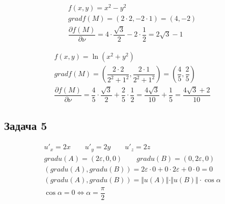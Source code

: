 \documentclass[a4paper,fleqn,12pt]{article}
\theoremstyle{definition}
\begin{document}
\begin{gather*}
f(x,y) = x^2 - y^2\\
gradf(M) = (2\cdot 2, -2 \cdot 1) = (4,-2)\\
\dfrac{\partial f(M)}{\partial \nu} = 4 \cdot \dfrac{\sqrt{3}}{2} -2 \cdot \dfrac{1}{2} = 2\sqrt{3} - 1
\end{gather*}

\begin{gather*}
f(x,y) = \ln{(x^2 + y^2)}\\
gradf(M) = \left(\dfrac{2 \cdot 2}{2^2+1^2}, \dfrac{2 \cdot 1}{2^2+1^2} \right) = \left(\dfrac{4}{5} , \dfrac{2}{5} \right) \\
\dfrac{\partial f(M)}{\partial \nu} = \dfrac{4}{5} \cdot \dfrac{\sqrt{3}}{2} + \dfrac{2}{5} \cdot \dfrac{1}{2} = \dfrac{4\sqrt{3}}{10} + \dfrac{1}{5} = \dfrac{4\sqrt{3} + 2}{10}
\end{gather*}
\subsection*{Задача 5}
\begin{gather*}
u'_x = 2x \qquad u'_y = 2y \qquad u'_z = 2z \\
grad u(A) = (2\varepsilon,0,0) \qquad grad u(B) = (0,2\varepsilon,0) \\
(grad u(A), grad u(B))= 2\varepsilon \cdot 0 + 0 \cdot 2\varepsilon + 0 \cdot 0 = 0 \\
(grad u(A), grad u(B)) = \Vert u(A) \Vert \cdot \Vert u(B) \Vert \cdot \cos{\alpha} \\
\cos{\alpha} = 0 \Leftrightarrow \alpha = \dfrac{\pi}{2}
\end{gather*}
\end{document}
